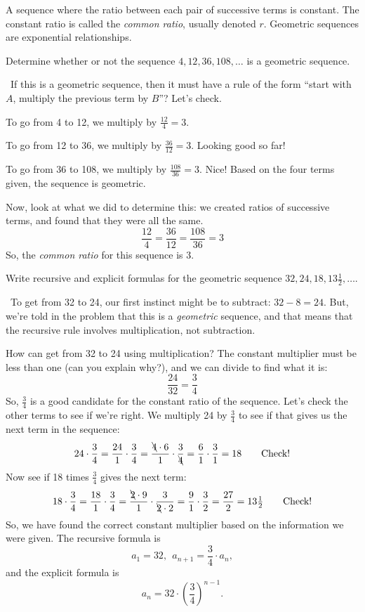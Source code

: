 \begin{boxeddef}
A sequence where the ratio between each pair of successive terms is constant. The constant ratio is called the \textit{common ratio}, usually denoted $r$. Geometric sequences are exponential relationships.
\end{boxeddef}


\begin{boxedex}
Determine whether or not the sequence $4, 12, 36, 108, \dotsc$ is a geometric sequence.

\exsoln\ If this is a geometric sequence, then it must have a rule of the form ``start with $A$, multiply the previous term by $B$''? Let's check.

To go from 4 to 12, we multiply by $\frac{12}{4} = 3$.

To go from 12 to 36, we multiply by $\frac{36}{12} = 3$. Looking good so far!

To go from 36 to 108, we multiply by $\frac{108}{36} = 3$. Nice! Based on the four terms given, the sequence is geometric.

Now, look at what we did to determine this: we created ratios of successive terms, and found that they were all the same. \[\frac{12}{4} = \frac{36}{12} = \frac{108}{36} = 3\] So, the \textit{common ratio} for this sequence is 3.
\end{boxedex}

\begin{boxedex}
Write recursive and explicit formulas for the geometric sequence $32, 24, 18, 13\tfrac{1}{2}, \dotsc$.

\exsoln\ To get from 32 to 24, our first instinct might be to subtract: $32 - 8 = 24$. But, we're told in the problem that this is a \textit{geometric} sequence, and that means that the recursive rule involves multiplication, not subtraction.

How can get from 32 to 24 using multiplication? The constant multiplier must be less than one (can you explain why?), and we can divide to find what it is: \[\frac{24}{32} = \frac{3}{4}\]
So, $\frac{3}{4}$ is a good candidate for the constant ratio of the sequence. Let's check the other terms to see if we're right. We multiply 24 by $\frac{3}{4}$ to see if that gives us the next term in the sequence: \[24 \cdot\frac{3}{4} = \frac{24}{1}\cdot\frac{3}{4} = \frac{\bcancel{4} \cdot 6}{1}\cdot\frac{3}{\bcancel{4}} = \frac{6}{1}\cdot\frac{3}{1} = 18 \qquad\text{Check!}\]
Now see if 18 times $\frac{3}{4}$ gives the next term:
\[18 \cdot\frac{3}{4} = \frac{18}{1}\cdot\frac{3}{4} = \frac{\bcancel{2} \cdot 9}{1}\cdot\frac{3}{\bcancel{2} \cdot 2} = \frac{9}{1}\cdot\frac{3}{2} = \frac{27}{2} = 13\tfrac{1}{2} \qquad\text{Check!}\]
So, we have found the correct constant multiplier based on the information we were given. The recursive formula is
\[a_1 = 32, ~~ a_{n+1} = \frac{3}{4} \cdot a_n,\] and the explicit formula is
\[a_n = 32 \cdot \left( \frac{3}{4} \right)^{n-1}.\]
\end{boxedex}

